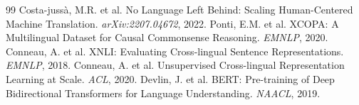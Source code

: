 \documentclass[11pt,a4paper]{article}
\begin{document}
\begin{thebibliography}{99}
 Costa-juss{\`a}, M.R. et al. No Language Left Behind: Scaling Human-Centered Machine Translation. \textit{arXiv:2207.04672}, 2022.
 Ponti, E.M. et al. XCOPA: A Multilingual Dataset for Causal Commonsense Reasoning. \textit{EMNLP}, 2020.
 Conneau, A. et al. XNLI: Evaluating Cross-lingual Sentence Representations. \textit{EMNLP}, 2018.
 Conneau, A. et al. Unsupervised Cross-lingual Representation Learning at Scale. \textit{ACL}, 2020.
 Devlin, J. et al. BERT: Pre-training of Deep Bidirectional Transformers for Language Understanding. \textit{NAACL}, 2019.
\end{thebibliography}
\end{document}
